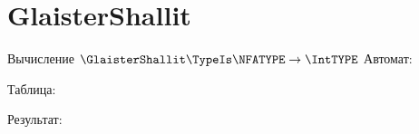 \section{GlaisterShallit}
\begin{frame}{Вычисление $\GlaisterShallit\TypeIs\NFATYPE\to\IntTYPE$}
	Автомат:


	Таблица:


	Результат:

\end{frame}
